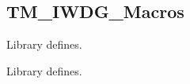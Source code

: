 \hypertarget{group___t_m___i_w_d_g___macros}{}\subsection{T\+M\+\_\+\+I\+W\+D\+G\+\_\+\+Macros}
\label{group___t_m___i_w_d_g___macros}


Library defines.  


Library defines. 


